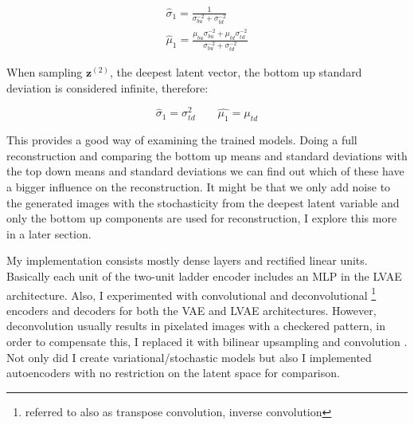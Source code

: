 \documentclass[12pt, english]{article}
\begin{document}
\vspace{4mm}

\begin{gather}
    \label{eq:z1-mean-sigma-1}
    \hat{\sigma}_{1} = \frac{1}{\sigma_{bu}^{-2} + \sigma_{td}^{-2}} \\
    \hat{\mu}_{1} = \frac{\mu_{bu}\sigma_{bu}^{-2} + \mu_{td}\sigma_{td}^{-2}}{\sigma_{bu}^{-2} + \sigma_{td}^{-2}}
    \label{eq:z1-mean-sigma-2}
\end{gather}

\vspace{4mm}

\par When sampling $\bm{z}^{(2)}$, the deepest latent vector, the bottom up standard deviation is considered infinite, therefore:

\vspace{4mm}

\begin{equation}
    \hat{\sigma}_{1} = \sigma_{td}^{2} \quad \quad \hat{\mu_{1}} = \mu_{td}
    \label{eq:ladder-vae-sampling}
\end{equation}

\vspace{4mm}

\par This provides a good way of examining the trained models. Doing a full reconstruction and comparing the bottom up means and standard deviations with the top down means and standard deviations we can find out which of these have a bigger influence on the reconstruction. It might be that we only add noise to the generated images with the stochasticity from the deepest latent variable and only the bottom up components are used for reconstruction, I explore this more in a later section.

\vspace{4mm}

\par My implementation consists mostly dense layers and rectified linear units. Basically each unit of the two-unit ladder encoder includes an MLP in the LVAE architecture. Also, I experimented with convolutional and deconvolutional \footnote{referred to also as transpose convolution, inverse convolution} encoders and decoders for both the VAE and LVAE architectures. However, deconvolution usually results in pixelated images with a checkered pattern, in order to compensate this, I replaced it with bilinear upsampling and convolution \cite{odena2016deconvolution}. Not only did I create variational/stochastic models but also I implemented autoencoders with no restriction on the latent space for comparison.
\end{document}

